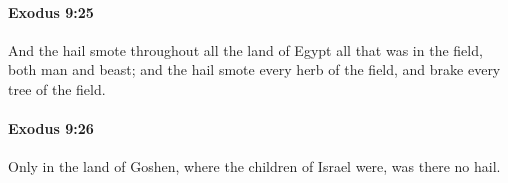 		\paragraph{Exodus 9:25} %
			\label{EXODUS-9-25}

			And the hail smote throughout all the land of Egypt all that was in the field, both man and beast; and the hail smote every herb of the field, and brake every tree of the field.


		\paragraph{Exodus 9:26} %
			\label{EXODUS-9-26}

			Only in the land of Goshen, where the children of Israel were, was there no hail.


